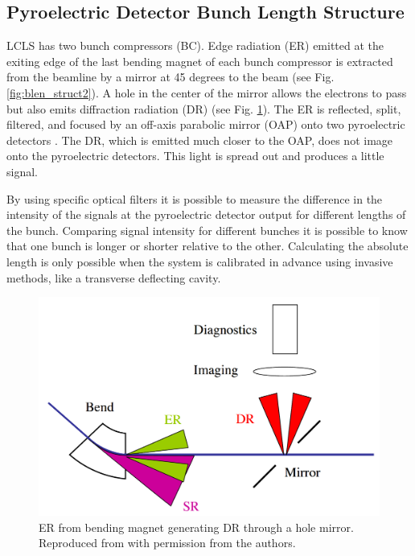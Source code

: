 \documentclass[letter,
        biblatex,   %
        keeplastbox,  %
        ]{jacow}
\begin{document}
\subsection{Pyroelectric Detector Bunch Length Structure}
LCLS has two bunch compressors (BC). Edge radiation (ER) emitted at the exiting edge of the last bending magnet of each bunch compressor is extracted from the beamline by a mirror at 45 degrees to the beam (see Fig. \ref{fig:blen_struct2}). A hole in the center of the mirror allows the electrons to pass but also emits diffraction radiation (DR) (see Fig. \ref{fig:blen_struct1}). The ER is reflected, split, filtered, and focused by an off-axis parabolic mirror (OAP) onto two pyroelectric detectors \cite{blen-pac07}. The DR, which is emitted much closer to the OAP, does not image onto the pyroelectric detectors. This light is spread out and produces a little signal.

By using specific optical filters it is possible to measure the difference in the intensity of the signals at the pyroelectric detector output for different lengths of the bunch. Comparing signal intensity for different bunches it is possible to know that one bunch is longer or shorter relative to the other. Calculating the absolute length is only possible when the system is calibrated in advance using invasive methods, like a transverse deflecting cavity. \cite{blen-pac07}

\begin{figure}[!htb]
  \centering
  \includegraphics*[width=\columnwidth]{BunchLengthStruct_1}
  \caption{ER from bending magnet generating DR through a hole mirror. Reproduced from \cite{blen-pac07} with permission from the authors.}
  \label{fig:blen_struct1}
\end{figure}
\end{document}

